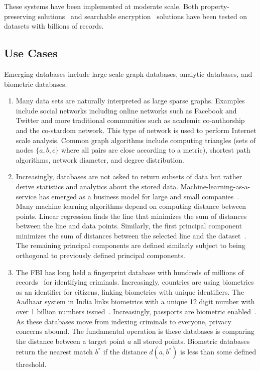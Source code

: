 These systems have been implemented at moderate scale.  Both property-preserving solutions~\cite{CACM:PRZB12,EPRINT:PodBoePop16} and searchable encryption~\cite{SP:PKVKMC14,SP:FVKKKM15,C:CJJKRS13,CCS:JJKRS13,NDSS:CJJJKR14,ESORICS:FJKNRS15,RSA:IKLO16} solutions have been tested on datasets with billions of records.

%


\subsection{Use Cases}
Emerging databases include large scale graph databases, analytic databases, and
biometric databases. 
\begin{enumerate}
\item Many data sets are naturally interpreted as large sparse graphs.  Examples include social networks including online networks such as Facebook and Twitter and more traditional communities such as academic co-authorship and the co-stardom network.  This type of network is used to perform Internet scale analysis.  Common graph algorithms include computing triangles (sets of nodes $\{a,b,c\}$ where all pairs are close according to a metric), shortest path algorithms, network diameter, and degree distribution.
\item  Increasingly, databases are not asked to return subsets of data but rather derive statistics and analytics about the stored data.  Machine-learning-as-a-service has emerged as a business model for large and small companies~\cite{mlservice}.  Many machine learning algorithms depend on computing distance between points. Linear regression finds the line that minimizes the sum of distances between the line and data points.  Similarly, the first principal component minimizes the sum of distances between the selected line and the dataset~\cite{wold1987principal}.  The remaining principal components are defined similarly subject to being orthogonal to previously defined principal components.
\item The FBI has long held a fingerprint database with hundreds of millions of records~\cite{brislawn1996fbi} for identifying criminals.  Increasingly, countries are using biometrics as an identifier for citizens, linking biometrics with unique identifiers.  The Aadhaar system in India links biometrics with a unique 12 digit number with over 1 billion numbers issued~\cite{daugman2014600}.  Increasingly, passports are biometric enabled~\cite{stanton2008icao}.  As these databases move from indexing criminals to everyone, privacy concerns abound.  The fundamental operation is these databases is comparing the distance between a target point $a$ all stored points. Biometric databases return the nearest match $b^*$ if the distance $d(a,b^*)$ is less than some defined threshold.  
\end{enumerate}

